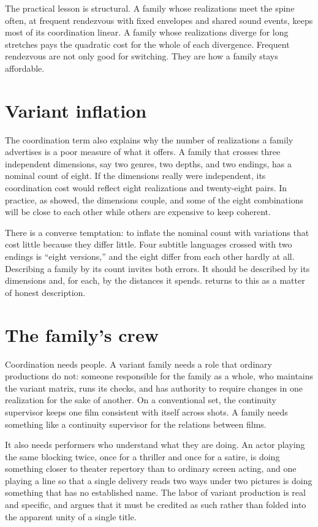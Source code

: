 The practical lesson is structural. A family whose realizations meet the spine often, at frequent rendezvous with fixed envelopes and shared sound events, keeps most of its coordination linear. A family whose realizations diverge for long stretches pays the quadratic cost for the whole of each divergence. Frequent rendezvous are not only good for switching. They are how a family stays affordable.

\section{Variant inflation}

The coordination term also explains why the number of realizations a family advertises is a poor measure of what it offers. A family that crosses three independent dimensions, say two genres, two depths, and two endings, has a nominal count of eight. If the dimensions really were independent, its coordination cost would reflect eight realizations and twenty-eight pairs. In practice, as  showed, the dimensions couple, and some of the eight combinations will be close to each other while others are expensive to keep coherent.

There is a converse temptation: to inflate the nominal count with variations that cost little because they differ little. Four subtitle languages crossed with two endings is ``eight versions,'' and the eight differ from each other hardly at all. Describing a family by its count invites both errors. It should be described by its dimensions and, for each, by the distances it spends.  returns to this as a matter of honest description.

\section{The family's crew}

Coordination needs people. A variant family needs a role that ordinary productions do not: someone responsible for the family as a whole, who maintains the variant matrix, runs its checks, and has authority to require changes in one realization for the sake of another. On a conventional set, the continuity supervisor keeps one film consistent with itself across shots. A family needs something like a continuity supervisor for the relations between films.

It also needs performers who understand what they are doing. An actor playing the same blocking twice, once for a thriller and once for a satire, is doing something closer to theater repertory than to ordinary screen acting, and one playing a line so that a single delivery reads two ways under two pictures is doing something that has no established name. The labor of variant production is real and specific, and  argues that it must be credited as such rather than folded into the apparent unity of a single title.
